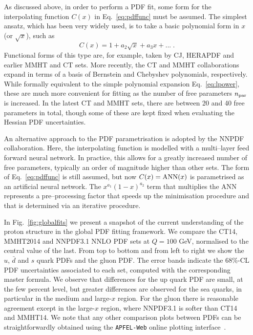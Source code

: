 As discussed above, in order to perform a  PDF fit, some form for the interpolating function $C(x)$ in Eq.~\eqref{eq:pdffunc}
must be assumed.
%
The simplest ansatz, which has been very widely used, is to take a basic polynomial form in $x$ (or $\sqrt{x}$), such as
\begin{equation}\label{eq:lpower}
C(x)=1+a_2\sqrt{x}+a_3 x+...\;.
\end{equation}
Functional forms of this type are, for example, taken by CJ, HERAPDF and earlier MMHT and CT sets. More recently, the CT and MMHT collaborations expand in terms of a basis of  Bernstein and Chebyshev polynomials, respectively.
%
While formally equivalent to the simple polynomial expansion
Eq.~\eqref{eq:lpower}, these are much more convenient for fitting as the number of free parameters $n_{\rm par}$ is increased.
%
In the latest CT and MMHT sets, there are between 20 and 40 free parameters in total,
though some of these are kept fixed when evaluating the
Hessian PDF uncertainties.

An alternative approach to the PDF parametrisation is adopted
by the NNPDF collaboration. Here, the interpolating function is modelled with a multi--layer feed forward neural network.
%
In practice, this allows for a greatly increased number of free parameters, typically an order of magnitude higher than other sets.
%
The form of Eq.~\eqref{eq:pdffunc} is still assumed, but
now $C(x)={\rm ANN}(x)$ is parametrised as an artificial
neural network.
%
The $x^{a_1}(1-x)^{a_2}$ term that multiplies the ANN represents
a pre--processing factor that speeds up the minimisation procedure
and that is determined via an iterative procedure.

In Fig.~\ref{fig:globalfits}
we present a snapshot of the current understanding
of the proton structure in the global PDF fitting framework.
%
We compare the CT14, MMHT2014
  and NNPDF3.1 NNLO PDF sets at $Q=100$ GeV, normalised
  to the central value of the last.
  From top to bottom and from left to right we show the
  $u$, $\bar{d}$ and $s$ quark PDFs and the gluon PDF.
  The error bands indicate the 68\%-CL PDF uncertainties
  associated to each set, computed with the corresponding
  master formula.
  We observe that differences for the up quark PDF
  are small, at the few percent level, but greater differences
  are observed for the sea quarks, in particular
  in the medium and large-$x$ region.
  For the gluon there is reasonable agreement except
  in the large-$x$ region, where NNPDF3.1 is softer than
  CT14 and MMHT14.
%
We note that any other comparison plots between PDFs can be straightforwardly
obtained using the {\tt APFEL-Web} online plotting interface~\cite{Carrazza:2014gfa}.


